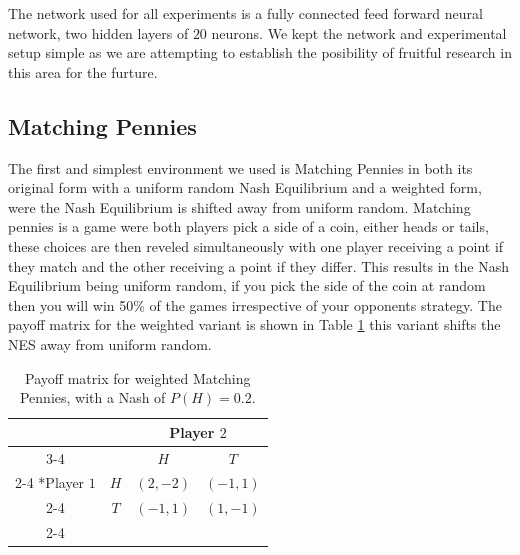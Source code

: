 \documentclass[conference]{IEEEtran}
\begin{document}
The network used for all experiments is a fully connected feed forward neural network, two hidden layers of $20$ neurons. We kept the network and experimental setup simple as we are attempting to establish the posibility of fruitful research in this area for the furture.

\subsection{Matching Pennies}

The first and simplest environment we used is Matching Pennies in both its original form with a uniform random Nash Equilibrium and a weighted form, were the Nash Equilibrium is shifted away from uniform random. Matching pennies is a game were both players pick a side of a coin, either heads or tails, these choices are then reveled simultaneously with one player receiving a point if they match and the other receiving a point if they differ. This results in the Nash Equilibrium being uniform random, if you pick the side of the coin at random then you will win 50\% of the games irrespective of your opponents strategy. The payoff matrix for the weighted variant is shown in Table \ref{tab:weighted-mp} this variant shifts the NES away from uniform random.


\begin{table}
    \centering
    \setlength{\extrarowheight}{2pt}
    \begin{tabular}{*{4}{c|}}
      \multicolumn{2}{c}{} & \multicolumn{2}{c}{Player $2$}\\\cline{3-4}
      \multicolumn{1}{c}{} &  & $H$  & $T$ \\\cline{2-4}
      \multirow{2}*{Player $1$}  & $H$ & $(2,-2)$ & $(-1,1)$ \\\cline{2-4}
      & $T$ & $(-1,1)$ & $(1,-1)$ \\\cline{2-4}
    \end{tabular}
    \caption{Payoff matrix for weighted Matching Pennies, with a Nash of $P(H)=0.2$.}
    \label{tab:weighted-mp}
\end{table}
\end{document}
